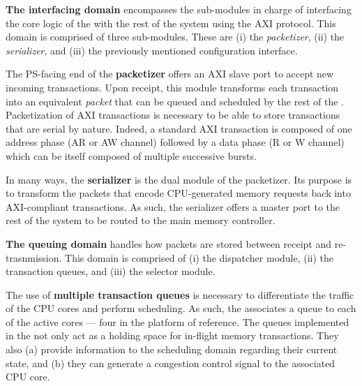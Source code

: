 \par{\bf The interfacing domain} encompasses the sub-modules in charge
of interfacing the core logic of the \schim with the rest of the
system using the AXI protocol.  This domain is comprised of three
sub-modules. These are (i) the \emph{packetizer}, (ii) the
\emph{serializer}, and (iii) the previously mentioned configuration
interface.

The PS-facing end of the {\bf packetizer} offers an AXI slave port to
accept new incoming transactions. Upon receipt, this module transforms
each transaction into an equivalent \emph{packet} that can be queued
and scheduled by the rest of the \schim. Packetization of AXI
transactions is necessary to be able to store transactions that are
serial by nature.  Indeed, a standard AXI transaction is composed of
one address phase (AR or AW channel) followed by a data phase (R or W
channel) which can be itself composed of multiple successive bursts.

In many ways, the {\bf serializer} is the dual module of the
packetizer. Its purpose is to transform the packets that encode
CPU-generated memory requests back into AXI-compliant transactions. As
such, the serializer offers a master port to the rest of the system to
be routed to the main memory controller.


\par{\bf The queuing domain} handles how packets are stored between
receipt and re-trasnmission. This domain is comprised of (i) the
dispatcher module, (ii) the transaction queues, and (iii) the selector
module.

The use of {\bf multiple transaction queues} is necessary to
differentiate the traffic of the CPU cores and perform scheduling. As
such, the \schim associates a queue to each of the active cores ---
four in the platform of reference.
The queues implemented in the \schim not only act as a holding space
for in-flight memory transactions.  They also (a) provide information
to the scheduling domain regarding their current state, and (b) they
can generate a congestion control signal to the associated CPU core.

